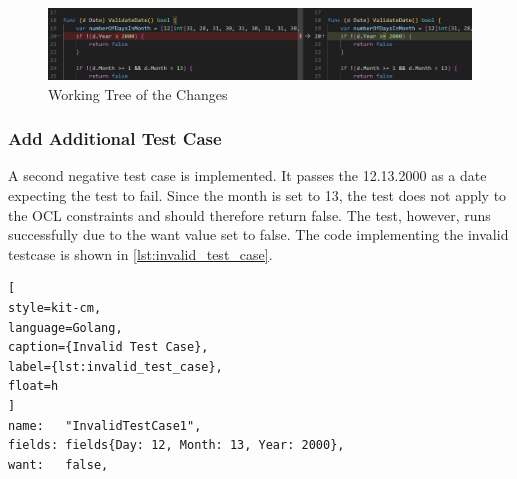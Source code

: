 \begin{figure}[H]
    \centering
    \includegraphics[width=\textwidth]{figures/goLang/carRental/carRental_dateTestWorkingTree.png}
    \caption{Working Tree of the Changes}
    \label{fig:car_rental_test_working_tree}
\end{figure}

\subsubsection*{Add Additional Test Case}
A second negative test case is implemented.
It passes the 12.13.2000 as a date expecting the test to fail.
Since the month is set to 13, the test does not apply to the OCL constraints and should therefore return false.
The test, however, runs successfully due to the want value set to false.
The code implementing the invalid testcase is shown in \autoref{lst:invalid_test_case}.

\begin{lstlisting}[
style=kit-cm,
language=Golang,
caption={Invalid Test Case},
label={lst:invalid_test_case},
float=h
]
name:   "InvalidTestCase1",
fields: fields{Day: 12, Month: 13, Year: 2000},
want:   false,  
\end{lstlisting}
